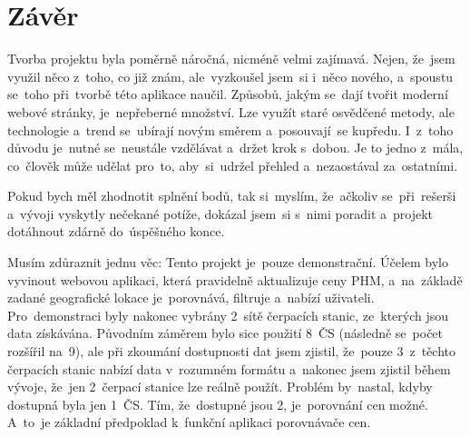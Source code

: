 \chapter{Závěr}
\label{sec:conclusion}

Tvorba projektu byla poměrně náročná, nicméně velmi zajímavá.
Nejen, že~jsem využil něco z~toho, co již znám, ale~vyzkoušel jsem~si
i~něco nového, a~spoustu se~toho při~tvorbě této aplikace naučil.
Způsobů, jakým se~dají tvořit moderní webové stránky, je~nepřeberné
množství. Lze využít staré osvědčené metody, ale technologie a~trend
se~ubírají novým směrem a~posouvají~se kupředu. I~z~toho důvodu je~nutné
se~neustále vzdělávat a~držet krok s~dobou. Je to jedno z~mála, co~člověk
může udělat pro~to, aby~si~udržel přehled a~nezaostával za~ostatními.

Pokud bych měl zhodnotit splnění bodů, tak si~myslím, že~ačkoliv
se~při~rešerši a~vývoji vyskytly nečekané potíže, dokázal jsem~si s~nimi
poradit a~projekt dotáhnout zdárně do~úspěšného konce.

Musím zdůraznit jednu věc: Tento projekt je~pouze demonstrační.
Účelem bylo vyvinout webovou aplikaci, která pravidelně aktualizuje
ceny PHM, a~na~základě zadané geografické lokace je~porovnává, filtruje
a~nabízí uživateli. Pro~demonstraci byly nakonec vybrány 2~sítě čerpacích
stanic, ze~kterých jsou data získávána. Původním záměrem bylo sice použití
8~ČS (následně se~počet rozšířil na~9), ale při zkoumání dostupnosti dat
jsem zjistil, že~pouze 3~z~těchto čerpacích stanic nabízí data v~rozumném
formátu a~nakonec jsem zjistil během vývoje, že~jen 2~čerpací stanice
lze reálně použít. Problém by~nastal, kdyby dostupná byla jen 1~ČS.
Tím, že~dostupné jsou 2, je~porovnání cen možné. A~to~je základní předpoklad
k~funkční aplikaci porovnávače cen.

